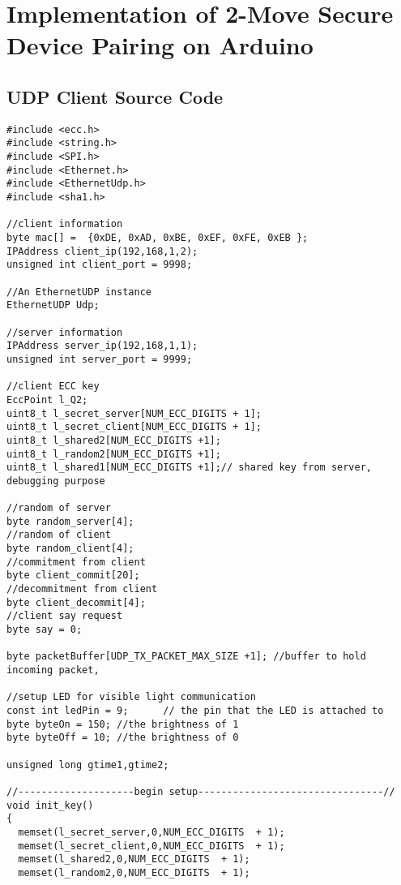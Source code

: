 
\chapter{Implementation of 2-Move Secure Device Pairing on Arduino} %

\label{AppendixC} %

\section{UDP Client Source Code}

{\small 
\begin{Verbatim}[fontsize=\small]
#include <ecc.h>
#include <string.h>
#include <SPI.h>
#include <Ethernet.h>
#include <EthernetUdp.h>
#include <sha1.h>

//client information
byte mac[] =  {0xDE, 0xAD, 0xBE, 0xEF, 0xFE, 0xEB };
IPAddress client_ip(192,168,1,2);
unsigned int client_port = 9998;

//An EthernetUDP instance
EthernetUDP Udp;

//server information
IPAddress server_ip(192,168,1,1);
unsigned int server_port = 9999;

//client ECC key
EccPoint l_Q2;
uint8_t l_secret_server[NUM_ECC_DIGITS + 1];
uint8_t l_secret_client[NUM_ECC_DIGITS + 1];
uint8_t l_shared2[NUM_ECC_DIGITS +1];
uint8_t l_random2[NUM_ECC_DIGITS +1];
uint8_t l_shared1[NUM_ECC_DIGITS +1];// shared key from server, debugging purpose

//random of server
byte random_server[4];
//random of client
byte random_client[4];
//commitment from client
byte client_commit[20];
//decommitment from client
byte client_decommit[4];
//client say request
byte say = 0;

byte packetBuffer[UDP_TX_PACKET_MAX_SIZE +1]; //buffer to hold incoming packet,

//setup LED for visible light communication
const int ledPin = 9;      // the pin that the LED is attached to
byte byteOn = 150; //the brightness of 1
byte byteOff = 10; //the brightness of 0

unsigned long gtime1,gtime2;

//--------------------begin setup--------------------------------//
void init_key()
{
  memset(l_secret_server,0,NUM_ECC_DIGITS  + 1);
  memset(l_secret_client,0,NUM_ECC_DIGITS  + 1);
  memset(l_shared2,0,NUM_ECC_DIGITS  + 1);
  memset(l_random2,0,NUM_ECC_DIGITS  + 1);


\end{Verbatim}}
